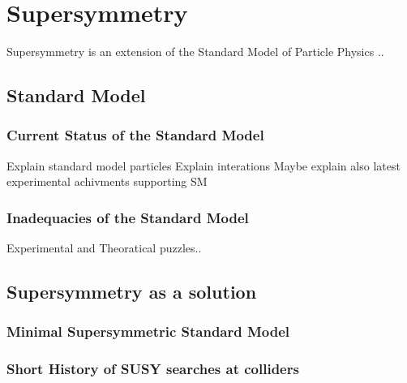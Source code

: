 \chapter{Supersymmetry}
Supersymmetry is an extension of the Standard Model of Particle Physics ..
\section{Standard Model}
\label{sec:StandardModel}
\subsection{Current Status of the Standard Model}
Explain standard model particles
Explain interations
Maybe explain also latest experimental achivments supporting SM
\newpage
\newpage
\subsection{Inadequacies of the Standard Model}
Experimental and Theoratical puzzles..
\newpage
\newpage
\section{Supersymmetry as a solution}
\newpage
\subsection{Minimal Supersymmetric Standard Model}
\newpage
\newpage
\subsection{Short History of SUSY searches at colliders}
\newpage
\newpage

